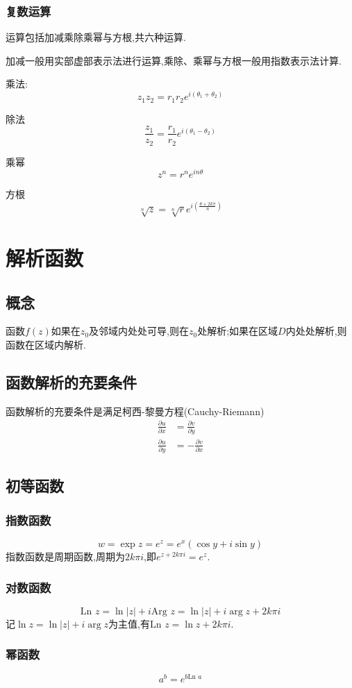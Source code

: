 \documentclass[12pt, a4paper, oneside]{ctexart}
\begin{document}
\subsubsection{复数运算}
运算包括加减乘除乘幂与方根,共六种运算.

加减一般用实部虚部表示法进行运算,乘除、乘幂与方根一般用指数表示法计算.

乘法:
\[
    z_1 z_2 = r_1 r_2 e^{i(\theta_1 + \theta_2)}
\]

除法
\[
    \frac{z_1}{z_2} = \frac{r_1}{r_2}e^{i(\theta_1 - \theta_2)}
\]

乘幂
\[
    z^n = r^n e^{in\theta}
\]

方根
\[
    \sqrt[n]{z} = \sqrt[n]{r} e^{i(\frac{\theta+2k\pi}{n})}
\]
\section{解析函数}
\subsection{概念}
函数$f(z)$如果在$z_0$及邻域内处处可导,则在$z_0$处解析;如果在区域$D$内处处解析,则函数在区域内解析.
\subsection{函数解析的充要条件}
函数解析的充要条件是满足柯西-黎曼方程(Cauchy-Riemann)
\begin{align*}
    \frac{\partial u}{\partial x} &= \frac{\partial v}{\partial y}\\
    \frac{\partial u}{\partial y} &= -\frac{\partial v}{\partial x}
\end{align*}
\subsection{初等函数}
\subsubsection{指数函数}
\[
    w = \exp z = e^z = e^x (\cos y + i \sin y)
\]
指数函数是周期函数,周期为$2k\pi i$,即$e^{z + 2k\pi i} = e^z$.
\subsubsection{对数函数}
\[
    \text{Ln } z = \ln |z| + i \text{Arg }z = \ln |z| + i \arg z + 2k\pi i
\]
记$\ln z = \ln |z| + i \arg z$为主值,有$\text{Ln }z = \ln z + 2k\pi i$.
\subsubsection{幂函数}
\[
    a^b = e^{b\text{Ln }a}
\]
\end{document}
